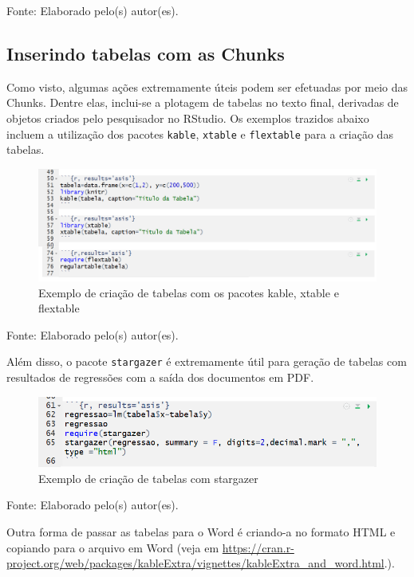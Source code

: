 \documentclass[12pt,brazil,oneside]{book}
\begin{document}
Fonte: Elaborado pelo(s) autor(es).

\hypertarget{inserindo-tabelas-com-as-chunks}{%
\subsection{Inserindo tabelas com as
Chunks}\label{inserindo-tabelas-com-as-chunks}}

Como visto, algumas ações extremamente úteis podem ser efetuadas por
meio das Chunks. Dentre elas, inclui-se a plotagem de tabelas no texto
final, derivadas de objetos criados pelo pesquisador no RStudio. Os
exemplos trazidos abaixo incluem a utilização dos pacotes
\texttt{kable}, \texttt{xtable} e \texttt{flextable} para a criação das
tabelas.

\begin{figure}[H]

{\centering \includegraphics[width=0.6\linewidth]{rmarkchunktab1} 

}

\caption{Exemplo de criação de tabelas com os pacotes kable, xtable e flextable}\label{fig:rmarkchunk31}
\end{figure}

Fonte: Elaborado pelo(s) autor(es).

Além disso, o pacote \texttt{stargazer} é extremamente útil para geração
de tabelas com resultados de regressões com a saída dos documentos em
PDF.

\begin{figure}[H]

{\centering \includegraphics[width=0.6\linewidth]{rmarkchunktab2} 

}

\caption{Exemplo de criação de tabelas com stargazer}\label{fig:rmarkchunk33}
\end{figure}

Fonte: Elaborado pelo(s) autor(es).

Outra forma de passar as tabelas para o Word é criando-a no formato HTML
e copiando para o arquivo em Word (veja em
\url{https://cran.r-project.org/web/packages/kableExtra/vignettes/kableExtra_and_word.html}.).
\end{document}
